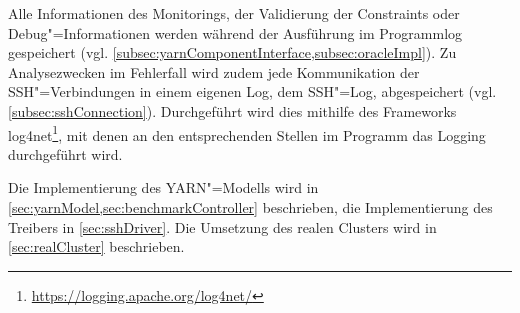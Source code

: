 Alle Informationen des Monitorings, der Validierung der Constraints oder Debug"=Informationen werden während der Ausführung im Programmlog gespeichert (vgl. \cref{subsec:yarnComponentInterface,subsec:oracleImpl}).
Zu Analysezwecken im Fehlerfall wird zudem jede Kommunikation der SSH"=Verbindungen in einem eigenen Log, dem SSH"=Log, abgespeichert (vgl. \cref{subsec:sshConnection}).
Durchgeführt wird dies mithilfe des Frameworks log4net\footnote{\url{https://logging.apache.org/log4net/}}, mit denen an den entsprechenden Stellen im Programm das Logging durchgeführt wird.

Die Implementierung des YARN"=Modells wird in \cref{sec:yarnModel,sec:benchmarkController} beschrieben, die Implementierung des Treibers in \cref{sec:sshDriver}.
Die Umsetzung des realen Clusters wird in \cref{sec:realCluster} beschrieben.
